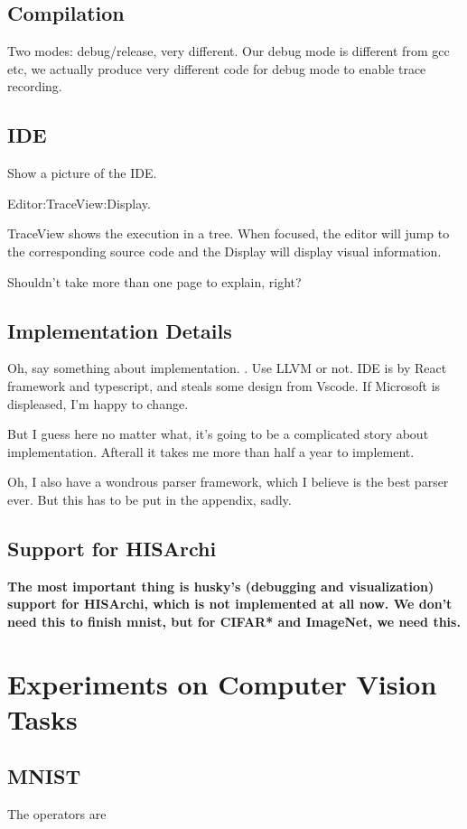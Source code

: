 \documentclass[10pt, oneside]{article}   	%
\theoremstyle{definition}
\begin{document}
\subsection{Compilation}


Two modes: debug/release, very different. Our debug mode is different from gcc etc, we actually produce very different code for debug mode to enable trace recording.
\subsection{IDE}

Show a picture of the IDE.

Editor:TraceView:Display.

TraceView shows the execution in a tree. When focused, the editor will jump to the corresponding source code and the Display will display visual information.

Shouldn't take more than one page to explain, right?

\subsection{Implementation Details}

Oh, say something about implementation. . Use LLVM or not. IDE is by React framework and typescript, and steals some design from Vscode. If Microsoft is displeased, I'm happy to change.

But I guess here no matter what, it's going to be a complicated story about implementation. Afterall it takes me more than half a year to implement.

Oh, I also have a wondrous parser framework, which I believe is the best parser ever. But this has to be put in the appendix, sadly.
\subsection{Support for HISArchi}

\textbf{The most important thing is husky's (debugging and visualization) support for HISArchi, which is not implemented at all now. We don't need this to finish mnist, but for CIFAR* and ImageNet, we need this.}
\section{Experiments on Computer Vision Tasks}
\subsection{MNIST}
The operators are
\end{document}
